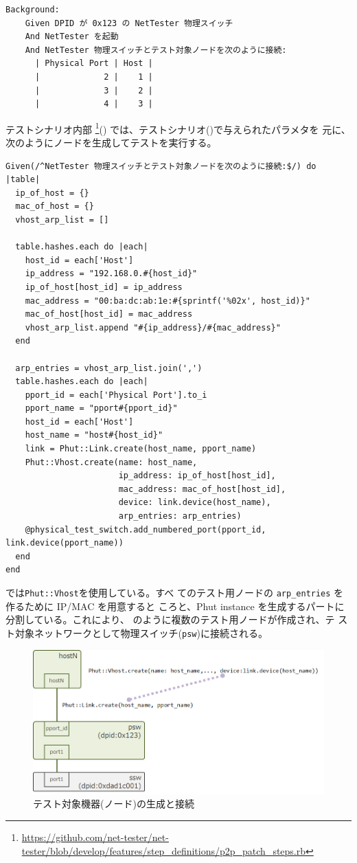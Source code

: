 \begin{lstlisting}[caption=テスト用ノードの生成,label=lst:create-testnode]
  Background:
    Given DPID が 0x123 の NetTester 物理スイッチ
    And NetTester を起動
    And NetTester 物理スイッチとテスト対象ノードを次のように接続:
      | Physical Port | Host |
      |             2 |    1 |
      |             3 |    2 |
      |             4 |    3 |
\end{lstlisting}

テストシナリオ内部
\footnote{\url{https://github.com/net-tester/net-tester/blob/develop/features/step_definitions/p2p_patch_steps.rb}}()
では、テストシナリオ()で与えられたパラメタを
元に、次のようにノードを生成してテストを実行する。

\begin{lstlisting}[caption=テスト用ノードの生成と操作,label=lst:operate-testnode]
Given(/^NetTester 物理スイッチとテスト対象ノードを次のように接続:$/) do |table|
  ip_of_host = {}
  mac_of_host = {}
  vhost_arp_list = []

  table.hashes.each do |each|
    host_id = each['Host']
    ip_address = "192.168.0.#{host_id}"
    ip_of_host[host_id] = ip_address
    mac_address = "00:ba:dc:ab:1e:#{sprintf('%02x', host_id)}"
    mac_of_host[host_id] = mac_address
    vhost_arp_list.append "#{ip_address}/#{mac_address}"
  end

  arp_entries = vhost_arp_list.join(',')
  table.hashes.each do |each|
    pport_id = each['Physical Port'].to_i
    pport_name = "pport#{pport_id}"
    host_id = each['Host']
    host_name = "host#{host_id}"
    link = Phut::Link.create(host_name, pport_name)
    Phut::Vhost.create(name: host_name,
                       ip_address: ip_of_host[host_id],
                       mac_address: mac_of_host[host_id],
                       device: link.device(host_name),
                       arp_entries: arp_entries)
    @physical_test_switch.add_numbered_port(pport_id, link.device(pport_name))
  end
end
\end{lstlisting}

では\verb|Phut::Vhost|を使用している。すべ
てのテスト用ノードの \verb|arp_entries| を作るために IP/MAC を用意すると
ころと、Phut instance を生成するパートに分割している。これにより、
のように複数のテスト用ノードが作成され、テ
スト対象ネットワークとして物理スイッチ(\verb|psw|)に接続される。

\begin{figure}[h]
 \centering
 \includegraphics[scale=0.6]{img/phut-testee-host.png}
 \caption{テスト対象機器(ノード)の生成と接続}
 \label{fig:phut-testee-host}
\end{figure}

